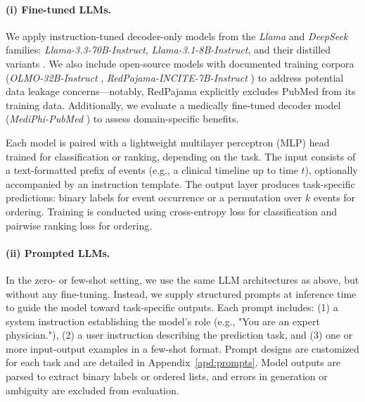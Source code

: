 \documentclass[letterpaper]{article} %
\begin{document}
\paragraph{(i) Fine-tuned LLMs.}  
We apply instruction-tuned decoder-only models from the \textit{Llama} and \textit{DeepSeek} families: \textit{Llama-3.3-70B-Instruct}, \textit{Llama-3.1-8B-Instruct}, and their distilled variants \citep{grattafiori2024llama, liu2024deepseek}. We also include open-source models with documented training corpora (\textit{OLMO-32B-Instruct} \citep{olmo20242}, \textit{RedPajama-INCITE-7B-Instruct} \citep{weber2024redpajama}) to address potential data leakage concerns---notably, RedPajama explicitly excludes PubMed from its training data. Additionally, we evaluate a medically fine-tuned decoder model (\textit{MediPhi-PubMed} \citep{corbeil2025modular}) to assess domain-specific benefits.

Each model is paired with a lightweight multilayer perceptron (MLP) head trained for classification or ranking, depending on the task. 
The input consists of a text-formatted prefix of events (e.g., a clinical timeline up to time $t$), optionally accompanied by an instruction template. 
The output layer produces task-specific predictions: binary labels for event occurrence or a permutation over $k$ events for ordering. 
Training is conducted using cross-entropy loss for classification and pairwise ranking loss for ordering.

\paragraph{(ii) Prompted LLMs.}  
In the zero- or few-shot setting, we use the same LLM architectures as above, but without any fine-tuning. 
Instead, we supply structured prompts at inference time to guide the model toward task-specific outputs. 
Each prompt includes: 
(1) a system instruction establishing the model’s role (e.g., "You are an expert physician."), 
(2) a user instruction describing the prediction task, and 
(3) one or more input-output examples in a few-shot format.
Prompt designs are customized for each task and are detailed in Appendix~\ref{apd:prompts}. Model outputs are parsed to extract binary labels or ordered lists, and errors in generation or ambiguity are excluded from evaluation.
\end{document}
